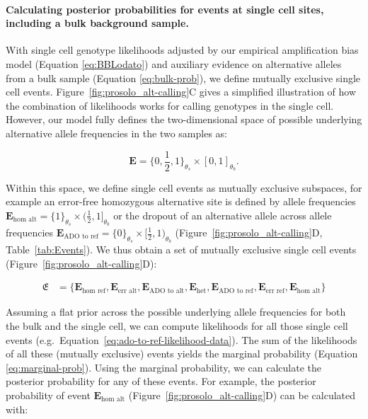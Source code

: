 \documentclass[fleqn,12pt,inline]{wlscirep}
\begin{document}
\paragraph{Calculating posterior probabilities for events at single cell sites, including a bulk background sample.}
With single cell genotype likelihoods adjusted by our empirical amplification bias model (Equation \ref{eq:BBLodato}) and auxiliary evidence on alternative alleles from a bulk sample (Equation \ref{eq:bulk-prob}), we define mutually exclusive single cell events.
Figure~\ref{fig:prosolo_alt-calling}C gives a simplified illustration of how the combination of likelihoods works for calling genotypes in the single cell.
However, our model fully defines the two-dimensional space of possible underlying alternative allele frequencies in the two samples as:

\begin{equation}
  \label{eq:event-space}
  \boldsymbol{E} =\{0, \frac{1}{2}, 1\}_{\theta_s} \times [0, 1]_{\theta_b}.
\end{equation}

Within this space, we define single cell events as mutually exclusive subspaces, for example an error-free homozygous alternative site is defined by allele frequencies $\boldsymbol{E}_{\text{hom alt}} = \{ 1 \}_{\theta_s} \times (\frac{1}{2}, 1]_{\theta_b}$  or the dropout of an alternative allele across allele frequencies $\boldsymbol{E}_{\text{ADO to ref}} = \{ 0 \}_{\theta_s} \times [\frac{1}{2}, 1)_{\theta_b}$ (Figure~\ref{fig:prosolo_alt-calling}D, Table~\ref{tab:Events}).
We thus obtain a set of mutually exclusive single cell events (Figure~\ref{fig:prosolo_alt-calling}D):

\begin{equation}
  \label{eq:event-set}
  \begin{split}
    \mathfrak{E} &= \{ \boldsymbol{E}_{\text{hom ref}}, \boldsymbol{E}_{\text{err alt}}, \boldsymbol{E}_{\text{ADO to alt}}, \boldsymbol{E}_{\text{het}}, \boldsymbol{E}_{\text{ADO to ref}}, \boldsymbol{E}_{\text{err ref}}, \boldsymbol{E}_{\text{hom alt}} \}
  \end{split}
\end{equation}

Assuming a flat prior across the possible underlying allele frequencies for both the bulk and the single cell, we can compute likelihoods for all those single cell events (e.g.~Equation~\ref{eq:ado-to-ref-likelihood-data}).
The sum of the likelihoods of all these (mutually exclusive) events yields the marginal probability (Equation \ref{eq:marginal-prob}).
Using the marginal probability, we can calculate the posterior probability for any of these events.
For example, the posterior probability of event $\boldsymbol{E}_{\text{hom alt}}$ (Figure~\ref{fig:prosolo_alt-calling}D) can be calculated with:
\end{document}
